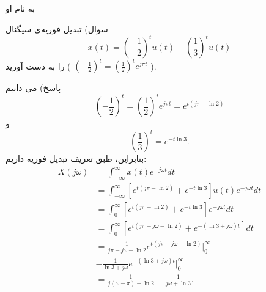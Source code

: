 \documentclass{article}
\begin{document}
\large

\begin{center}
به نام او

\hrulefill
\end{center}

سوال) تبدیل فوریه‌ی سیگنال 
$$
x(t)=(-\frac{1}{2})^tu(t)+(\frac{1}{3})^tu(t)
$$
را به دست آورید (
$
(-\frac{1}{2})^t=(\frac{1}{2})^te^{j\pi t}
$
).

پاسخ) می دانیم
$$
(-\frac{1}{2})^t=(\frac{1}{2})^te^{j\pi t}
=e^{t(j\pi-\ln 2)}
$$
و
$$
(\frac{1}{3})^t=e^{-t\ln 3}
.
$$
بنابراین، طبق تعریف تبدیل فوریه داریم:
\[\begin{split}
X(j\omega)
&=
\int_{-\infty}^{\infty} x(t)e^{-j\omega t}dt
\\&=
\int_{-\infty}^{\infty} \left[
e^{t(j\pi-\ln 2)}+e^{-t\ln 3}
\right]u(t)e^{-j\omega t}dt
\\&=
\int_{0}^{\infty} \left[
e^{t(j\pi-\ln 2)}+e^{-t\ln 3}
\right]e^{-j\omega t}dt
\\&=
\int_{0}^{\infty} \left[
e^{t(j\pi-j\omega-\ln 2)}+e^{-(\ln 3+j\omega) t}
\right]dt
\\&=
\frac{1}{j\pi-j\omega-\ln 2}e^{t(j\pi-j\omega-\ln 2)}\Big|_{0}^{\infty}
\\&-\frac{1}{\ln 3+j\omega}e^{-(\ln 3+j\omega) t}\Big|_{0}^{\infty}
\\&=
\frac{1}{j(\omega-\pi)+\ln 2}
+\frac{1}{j\omega+\ln 3}.
\end{split}\]
\end{document}

